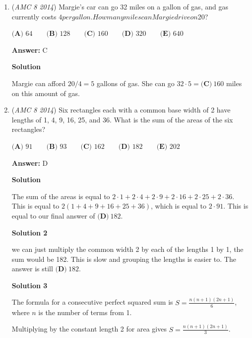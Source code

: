 \begin{enumerate}
 


 


	\item (\textit{AMC 8 2014}) Margie's car can go 32 miles on a gallon of gas, and gas currently costs $4 per gallon. How many miles can Margie drive on $20?


 $\textbf{(A) }64\qquad\textbf{(B) }128\qquad\textbf{(C) }160\qquad\textbf{(D) }320\qquad\textbf{(E) }640$

 \textbf{Answer: }C



\textbf{Solution}

Margie can afford $20/4=5$ gallons of gas. She can go $32\cdot5=\boxed{\textbf{(C)}~160}$ miles on this amount of gas.

 


 


	\item (\textit{AMC 8 2014}) Six rectangles each with a common base width of 2 have lengths of 1, 4, 9, 16, 25, and 36. What is the sum of the areas of the six rectangles?


 $\textbf{(A) }91\qquad\textbf{(B) }93\qquad\textbf{(C) }162\qquad\textbf{(D) }182\qquad\textbf{(E) }202$

 \textbf{Answer: }D



\textbf{Solution}

The sum of the areas is equal to $2\cdot1+2\cdot4+2\cdot9+2\cdot16+2\cdot25+2\cdot36$. This is equal to $2(1+4+9+16+25+36)$, which is equal to $2\cdot91$. This is equal to our final answer of $\boxed{\textbf{(D)}~182}$.

 


 



\textbf{Solution 2}

we can just multiply the common width 2 by each of the lengths 1 by 1, the sum would be 182. This is slow and grouping the lengths is easier to. The answer is still $\boxed{\textbf{(D)}~182}$.

 



\textbf{Solution 3}

The formula for a consecutive perfect squared sum is $S = \frac{n(n+1)(2n+1)}{6}$, where $n$ is the number of terms from 1.

 Multiplying by the constant length 2 for area gives $S = \frac{n(n+1)(2n+1)}{3}$.


\end{enumerate}
